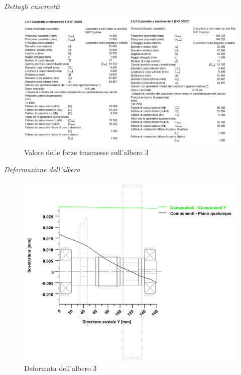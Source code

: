 \emph{Dettagli cuscinetti}
\begin{figure}[h]
    \centering
    \includegraphics[scale=0.5]{Immagini/Forze2CuscinettiAlbero3.png}
    \caption{Valore delle forze trasmesse sull'albero 3}
    \label{fig:Forze2CusinettiAlbero3}
\end{figure}
\newpage
\emph{Deformazione dell'albero}
\begin{figure}[h]
    \centering
    \includegraphics[scale=0.5]{Immagini/Deformata2Albero3.png}
    \caption{Deformata dell'albero 3}
    \label{fig:Deformata2Albero3}
\end{figure}

